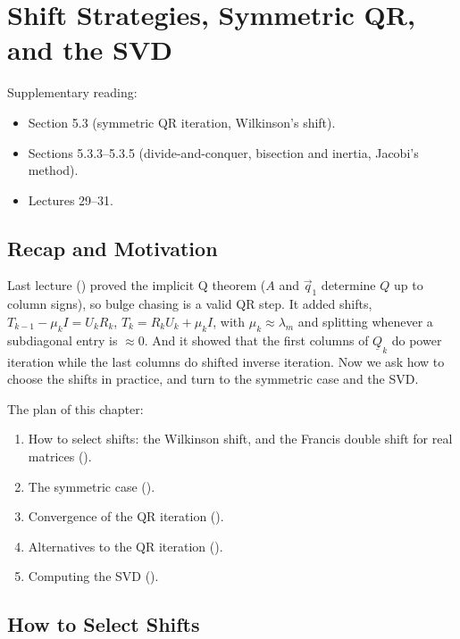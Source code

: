 \chapter{Shift Strategies, Symmetric QR, and the SVD}
\label{ch:shifts-svd}

Supplementary reading:
\begin{itemize}
  \item \cite{Demmel} Section 5.3 (symmetric QR iteration, Wilkinson's shift).
  \item \cite{Demmel} Sections 5.3.3--5.3.5 (divide-and-conquer, bisection and inertia, Jacobi's method).
  \item \cite{TB} Lectures 29--31.
\end{itemize}

\section{Recap and Motivation}

Last lecture () proved the implicit Q theorem ($A$ and $\vec{q}_1$ determine $Q$ up to column signs), so bulge chasing is a valid QR step. It added shifts, $T_{k-1} - \mu_kI = U_kR_k$, $T_k = R_kU_k + \mu_kI$, with $\mu_k \approx \lambda_m$ and splitting whenever a subdiagonal entry is $\approx 0$. And it showed that the first columns of $\underline{Q}_k$ do power iteration while the last columns do shifted inverse iteration. Now we ask how to choose the shifts in practice, and turn to the symmetric case and the SVD.

The plan of this chapter:
\begin{enumerate}
  \item How to select shifts: the Wilkinson shift, and the Francis double shift for real matrices ().
  \item The symmetric case ().
  \item Convergence of the QR iteration ().
  \item Alternatives to the QR iteration ().
  \item Computing the SVD ().
\end{enumerate}

\section{How to Select Shifts}
\label{sec:select-shifts}

